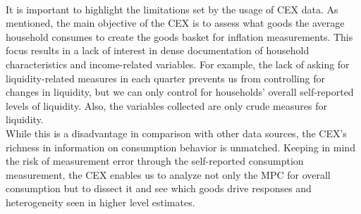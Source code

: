 \\ It is important to highlight the limitations set by the usage of CEX data. As mentioned, the main objective of the CEX is to assess what goods the average household consumes to create the goods basket for inflation measurements. This focus results in a lack of interest in dense documentation of household characteristics and income-related variables. For example, the lack of asking for liquidity-related measures in each quarter prevents us from controlling for changes in liquidity, but we can only control for households' overall self-reported levels of liquidity. Also, the variables collected are only crude measures for liquidity. \\
While this is a disadvantage in comparison with other data sources, the CEX's richness in information on consumption behavior is unmatched. Keeping in mind the risk of measurement error through the self-reported consumption measurement, the CEX enables us to analyze not only the MPC for overall consumption but to dissect it and see which goods drive responses and heterogeneity seen in higher level estimates.
